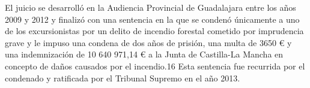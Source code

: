 El juicio se desarrolló en la Audiencia Provincial de Guadalajara entre los años 2009 y 2012 y finalizó con una sentencia en la que se condenó únicamente a uno de los excursionistas por un delito de incendio forestal cometido por imprudencia grave y le impuso una condena de dos años de prisión, una multa de 3650 € y una indemnización de 10 640 971,14 € a la Junta de Castilla-La Mancha en concepto de daños causados por el incendio.16​ Esta sentencia fue recurrida por el condenado y ratificada por el Tribunal Supremo en el año 2013.
